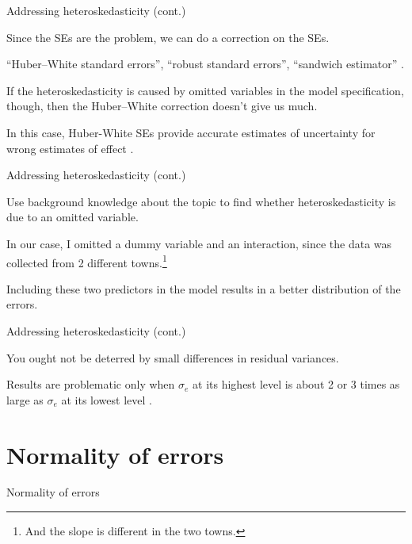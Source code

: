 \documentclass[12pt,english,pdf,xcolor=dvipsnames,aspectratio=169,handout]{beamer}\usepackage[]{graphicx}\usepackage[]{xcolor}
\begin{document}
\begin{frame}{Addressing heteroskedasticity (cont.)}

Since the SEs are the problem, we can do a correction on the SEs.\bigskip

``Huber--White standard errors'', ``robust standard errors'', ``sandwich estimator'' \cite{huber1967,white1980}.\bigskip

If the heteroskedasticity is caused by omitted variables in the model specification, though, then the Huber--White correction doesn't give us much.\bigskip

In this case, Huber-White SEs provide accurate estimates of uncertainty for wrong estimates of effect \cite{freedman2006}.

\end{frame}



\begin{frame}[fragile]{Addressing heteroskedasticity (cont.)}

Use background knowledge about the topic to find whether heteroskedasticity is due to an omitted variable.\bigskip

In our case, I omitted a dummy variable and an interaction, since the data was collected from 2 different towns.\footnote{And the slope is different in the two towns.}\bigskip

Including these two predictors in the model results in a better distribution of the errors.

\end{frame}



\begin{frame}[fragile]{Addressing heteroskedasticity (cont.)}

You ought not be deterred by small differences in residual variances.\bigskip

Results are problematic only when $\sigma_e$ at its highest level is about 2 or 3 times as large as $\sigma_e$ at its lowest level \cite{fox2008}.

\end{frame}






\section{Normality of errors}

\begin{frame}
\begin{center}
    \Huge Normality of errors
\end{center}
\end{frame}
\end{document}

